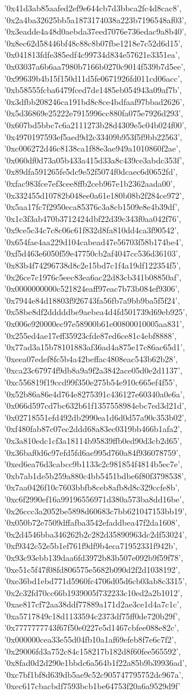 {'0x41d3ab85aafed2ef9e644cb7d3bbca2fc4d8cac8', '0x2a4ba32625bb5a1873174038a223b7196548af03', '0x3eadde4a48d0aebda37eed7076e736edac9a8b40', '0x8ec62d58446bf48c88c8b07fbe1218e7c52d6d15', '0x041813fdfe385edf4c99734d834e57621e3351ea', '0x03037a6b6aa7980b7166b0270c9014f539b7d5ee', '0x99639b4b15f150d11d5fe0671926fd011cd06acc', '0xb58555fcba6479fced7de1485eb054943a09af7b', '0x3dfbb208246ca191bd8c8ce4bdfaaf97bbad2626', '0x5d36869e25222e7915996cc880fa075e7926d293', '0x607bd5bbc7c6a2111273b28d4309e5c04b024f00', '0x4970197593ef5aed9d2c33409b953f5f9bb22563', '0xc006272d46c8138ca1f88e3ae949a1010860f2ae', '0x060df0d73a05b433a415d33a8c439ce3abdc353f', '0x89dfa591265fe5dc9e52f5074f0dcaec6d0652fd', '0xfac983fce7ef3cee8ffb2ceb967e1b2362aada00', '0x332455d10782b048ee0a61e180b08b2f284ce972', '0x5aa17fc7f2950eca85376c3a8cb1509e8e4b39df', '0x1c3f3ab470b3712424dbf22d39c343f0aa042f76', '0x9ce5c34c7c8c06c61f832d8fa810dd4ca3f90542', '0x654fae4aa229d104cabead47e56703f58b174be4', '0xf5d463e6050f59e47750cb2af4047cc536d36103', '0x83b4f74296738d8c2e15bd7c1f4a19df122354f5', '0x26ce7c1976c5eec83ea6ac22d83cb341b08850af', '0x0000000000c521824eaff97eac7b73b084ef9306', '0x7944e84d18803f926743fa56fb7a9bb9ba5f5f24', '0x58be8df2dddddbe9aebea4d4fd501739d69eb925', '0x006e920000ec97e58900b61e00800010005aa831', '0x255ed4ae17eff35923cfde87ed6ce81c4ebf8888', '0x77ad3a15b78101883af36ad4a875e17c86ac65d1', '0xeea07edef8fc5b4a42beffac4808eac543b62b28', '0xca23c67974f9db8a9a9f2a3842ace05d0e2d1137', '0xc556819f19ccd99f350e275b54e910c665ef4f55', '0x52b86a86e4d764e8275391c436127e60340a0e6a', '0x066d597cd7bc632b61f1357558984ebc7ed3d21d', '0x02718551efd492db2990ea1d6d0d57a90c353b02', '0xf480fab87c07ec2ddd68a83ec0319bb466b1afa2', '0x3a810edc1cf3a18114b95839ffb0ed90d3cb2d65', '0x36baf0d6c97efd5fd6ae995d760a84f936078759', '0xed6ea76d3cabcc9b1133c2c981854f4814b5ec7e', '0xb7ab1de5b259a880c4bb5451bdbe6f80f3798538', '0x7aa0426f10c7603bbfb8ceb8afb8d8c329ccfe8b', '0xc6f2990ef16a99196556971d380a573ba8dd16be', '0x26ccc3a2052be5898d60683c7bb621047153bb19', '0x050b72e7509dffafba3542efaddbea47f2da1608', '0x2d4546bba346262b2c282d35890963dc2df53024', '0xf9342c52e5b1ef761f9df9b4eca71952331f942b', '0x93c93ebb139daa6fd3972b83b507e092b9f59f78', '0xe51c5f47f08fd806575e5682b090d2f2d1038192', '0xe36bd1ebd771d5960fc4706d05d6cb03ab8c3315', '0x2c32fd70cc66b1939005f732233c10ed2a2b1012', '0xae817cf72aa38ddf77889a171d2ae3ce1d4a7c1c', '0xa5717849c18d1133594c2373df75ff0de720b29f', '0x7777777743f67f50e0227e5d1467cbfee088e82c', '0x000000cea33e55d04fb10a1af69efeb8f7e6c7f2', '0x29006fd3a752c84c158217b182d8f60fee565592', '0x8fad0d2d290e1bbdc6a564b1f22a85b9b39936ad', '0xc7bf1bf8d639db5ae9c52c905747795752dc967a', '0xec617cbacbdf7593bcb1be64753f20a6a9529d9f'}